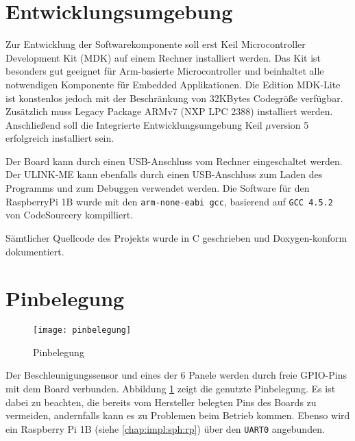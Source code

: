 \section{Entwicklungsumgebung}
Zur Entwicklung der Softwarekomponente soll erst Keil\textsuperscript{\scriptsize\textregistered} Microcontroller Development Kit (MDK) auf einem Rechner installiert werden. Das Kit ist besonders gut geeignet für Arm\textsuperscript{\scriptsize\textregistered}-basierte Microcontroller und beinhaltet alle notwendigen Komponente für Embedded Applikationen. Die Edition MDK-Lite ist konstenlos jedoch mit der Beschränkung von 32KBytes Codegröße verfügbar. Zusätzlich muss Legacy Package ARMv7 (NXP LPC 2388) installiert werden. Anschließend soll die Integrierte Entwicklungsumgebung Keil $\mu$version 5 erfolgreich installiert sein.

Der Board kann durch einen USB-Anschluss vom Rechner eingeschaltet werden. Der ULINK-ME kann ebenfalls durch einen USB-Anschluss zum Laden des Programms und zum Debuggen verwendet werden.
Die Software für den RaspberryPi 1B wurde mit den \texttt{arm-none-eabi gcc}, basierend auf \texttt{GCC 4.5.2} von CodeSourcery kompilliert.

Sämtlicher Quellcode des Projekts wurde in C geschrieben und Doxygen-konform dokumentiert.


\section{Pinbelegung}

\begin{figure}
	\centering
	\texttt{[image: pinbelegung]}
	\caption[Pinbelegung]{Pinbelegung}
	\label{fig:pins}
\end{figure}

Der Beschleunigungssensor und eines der 6 Panele werden durch freie GPIO-Pins mit dem Board verbunden. Abbildung \ref{fig:pins} zeigt die genutzte Pinbelegung. Es ist dabei zu beachten, die bereits vom Hersteller belegten Pins des Boards zu vermeiden, andernfalls kann es zu Problemen beim Betrieb kommen. Ebenso wird ein Raspberry Pi 1B (siehe \ref{chap:impl:sph:rp}) über den \texttt{UART0} angebunden.